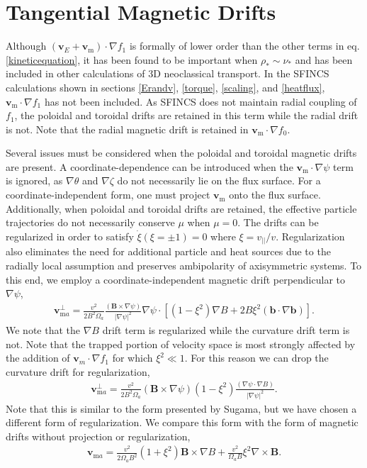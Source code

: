 \documentclass[aip, pop, preprint]{revtex4-1}
\numberwithin{figure}{section}
\numberwithin{equation}{section}
\begin{document}
\FloatBarrier

\section{Tangential Magnetic Drifts}\label{mds}
Although $(\bm{v}_E + \bm{v}_{\text{m}}) \cdot \nabla f_1$ is formally of lower order than the other terms in eq. \ref{kineticequation}, it has been found to be important when $\rho_* \sim \nu_*$ \cite{Calvo2016, Matsuoka2015} and has been included in other calculations of 3D neoclassical transport. In the SFINCS calculations shown in sections \ref{Erandv}, \ref{torque}, \ref{scaling}, and \ref{heatflux}, $\bm{v}_{\text{m}} \cdot \nabla f_1$ has not been included. As SFINCS does not maintain radial coupling of $f_1$, the poloidal and toroidal drifts are retained in this term while the radial drift is not. Note that the radial magnetic drift is retained in $\bm{v}_{\text{m}} \cdot \nabla f_0$. 

Several issues must be considered when the poloidal and toroidal magnetic drifts are present. A coordinate-dependence can be introduced when the $\bm{v}_{\text{m}} \cdot \nabla \psi$ term is ignored, as $\nabla \theta$ and $\nabla \zeta$ do not necessarily lie on the flux surface. For a coordinate-independent form, one must project $\bm{v}_{\text{m}}$ onto the flux surface. Additionally, when poloidal and toroidal drifts are retained, the effective particle trajectories do not necessarily conserve $\mu$ when $\mu = 0$. The drifts can be regularized in order to satisfy $\dot{\xi} (\xi = \pm 1) = 0$ where $\xi = v_{||}/v$. Regularization also eliminates the need for additional particle and heat sources due to the radially local assumption and preserves ambipolarity of axisymmetric systems.\cite{Sugama2016} To this end, we employ a coordinate-independent magnetic drift perpendicular to $\nabla \psi$,
\begin{gather}
\bm{v}_{\text{m}a}^{\perp} = \frac{v^2}{2B^2 \Omega_a} \frac{(\bm{B} \times \nabla \psi)}{\rvert \nabla \psi \rvert^2} \nabla \psi \cdot\left[(1-\xi^2)\nabla B + 2B\xi^2 (\bm{b} \cdot \nabla \bm{b}) \right].
\end{gather}
We note that the $\nabla B$ drift term is regularized while the curvature drift term is not. Note that the trapped portion of velocity space is most strongly affected by the addition of $\bm{v}_m \cdot \nabla f_1$ for which $\xi^2 \ll 1$. For this reason we can drop the curvature drift for regularization,
\begin{gather}
\bm{v}_{\text{m}a}^{\perp} = \frac{v^2}{2B^2 \Omega_a} (\bm{B} \times \nabla \psi) (1 - \xi^2) \frac{(\nabla \psi \cdot \nabla B)}{\rvert \nabla \psi \rvert^2}.
\label{eq:mds5}
\end{gather}
Note that this is similar to the form presented by Sugama,\cite{Sugama2016} but we have chosen a different form of regularization. We compare this form with the form of magnetic drifts without projection or regularization,
\begin{gather}
\bm{v}_{\text{m}a} = \frac{v^2}{2 \Omega_a B^2} (1 + \xi^2) \bm{B} \times \nabla B + \frac{v^2}{\Omega_a B} \xi^2 \nabla \times \bm{B}.
\label{eq:mds1}
\end{gather}
\end{document}

